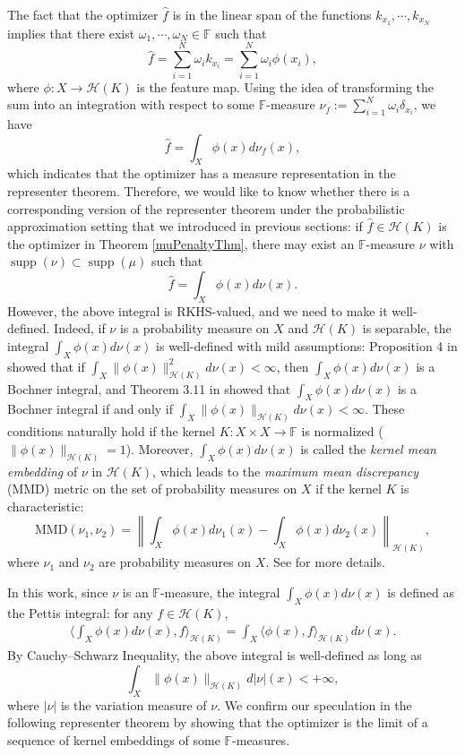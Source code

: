 \documentclass{amsart}
\numberwithin{equation}{section}
\DeclareMathOperator{\supp}{supp}
\theoremstyle{plain}
\theoremstyle{remark}
\theoremstyle{definition}
\begin{document}
The fact that the optimizer $\hat{f}$ is in the linear span of the functions $k_{x_1}, \cdots, k_{x_N}$ implies that there exist $\omega_1, \cdots, \omega_N \in \mathbb{F}$ such that 
$$\hat{f} = \sum_{i=1}^N \omega_i k_{x_i} = \sum_{i=1}^N \omega_i \phi(x_i), $$
where $\phi:X \rightarrow \mathscr{H}(K)$ is the feature map. Using the idea of transforming the sum into an integration with respect to some $\mathbb{F}$-measure $\nu_f:= \sum\limits_{i=1}^N \omega_i \delta_{x_i}$, we have
$$\hat{f} = \int_{X} \phi(x) d\nu_f(x), $$
which indicates that the optimizer has a measure representation in the representer theorem.
Therefore, we would like to know whether there is a corresponding version of the representer theorem under the probabilistic approximation setting that we introduced in previous sections: if $\hat{f} \in \mathscr{H}(K)$ is the optimizer in Theorem \ref{muPenaltyThm}, there may exist an $\mathbb{F}$-measure $\nu$ with $\supp(\nu) \subset \supp(\mu)$ such that 
\begin{equation*}
    \hat{f} = \int_{X} \phi(x) d\nu(x).
\end{equation*} 
However, the above integral is RKHS-valued, and we need to make it well-defined. Indeed, if $\nu$ is a probability measure on $X$ and $\mathscr{H}(K)$ is separable, the integral $ \int_{X} \phi(x) d\nu(x)$ is well-defined with mild assumptions:  Proposition 4 in \cite{aydin2021probability} showed that if $\int_X \|\phi(x)\|_{\mathscr{H}(K)}^2d\nu(x)<\infty  $, then $ \int_{X} \phi(x) d\nu(x)$ is a Bochner integral, and Theorem 3.11 in \cite{kukush2020gaussian} showed that $ \int_{X} \phi(x) d\nu(x)$ is a Bochner integral if and only if $\int_X \|\phi(x)\|_{\mathscr{H}(K)}d\nu(x)<\infty $. These conditions naturally hold if the kernel $K: X \times X \rightarrow \mathbb{F}$ is normalized ($\|\phi(x)\|_{\mathscr{H}(K)} =1$).  
Moreover, $\int_{X} \phi(x) d\nu(x)$ is called the \emph{kernel mean embedding} of $\nu$ in $\mathscr{H}(K)$, which leads to the \emph{maximum mean discrepancy} (MMD) metric on the set of probability measures on $X$ if the kernel $K$ is characteristic: 
$$\text{MMD}(\nu_1, \nu_2) = \left\| \int_X \phi(x) d\nu_1(x) -\int_X \phi(x) d\nu_2(x) \right\|_{\mathscr{H}(K)},$$
where $\nu_1$ and $\nu_2$ are probability measures on $X$. See    \cite{muandet2017kernel, song2008learning} for more details. 

In this work, since $\nu$ is an $\mathbb{F}$-measure, the integral $ \int_{X} \phi(x) d\nu(x)$ is defined as the Pettis integral: for any $f \in \mathscr{H}(K)$,  
     \begin{align*}
            \langle \int_{X} \phi(x) d\nu(x), f \rangle_{\mathscr{H}(K)} 
    =\int_{X} \langle \phi(x), f \rangle_{\mathscr{H}(K)} d\nu(x). 
    \end{align*}
By Cauchy–Schwarz Inequality, the above integral is well-defined as long as 
     $$\int_X \|\phi(x)\|_{\mathscr{H}(K)} d|\nu|(x) < +\infty, $$
where $\vert \nu \vert$ is the variation measure of $\nu$.
We confirm our speculation in the following representer theorem by showing that the optimizer is the limit of a sequence of kernel embeddings of some $\mathbb{F}$-measures.
\end{document}
